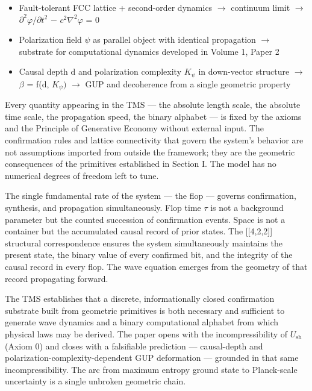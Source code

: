 \documentclass[11pt,oneside]{report}
\theoremstyle{definition}
\theoremstyle{remark}
\begin{document}
\begin{itemize}
  co-generated conjugate pair \ensuremath{(\varphi ,} \ensuremath{\Pi )} \ensuremath{\to} second-order dynamics
\item
  Fault-tolerant FCC lattice + second-order dynamics \ensuremath{\to} continuum limit \ensuremath{\to}
  \ensuremath{\partial ^{2}\varphi /\partial t^{2}} \ensuremath{-} \ensuremath{c^{2}\nabla ^{2}\varphi} = 0
\item
  Polarization field \ensuremath{\psi} as parallel object with identical propagation \ensuremath{\to}
  substrate for computational dynamics developed in Volume 1, Paper 2
\item
  Causal depth d and polarization complexity \ensuremath{K_{\psi}} in down-vector
  structure \ensuremath{\to} \ensuremath{\beta} = f(d, \ensuremath{K_{\psi})} \ensuremath{\to} GUP and decoherence from a single
  geometric property
\end{itemize}

Every quantity appearing in the TMS --- the absolute length scale, the
absolute time scale, the propagation speed, the binary alphabet --- is
fixed by the axioms and the Principle of Generative Economy without
external input. The confirmation rules and lattice connectivity that
govern the system's behavior are not assumptions imported from outside
the framework; they are the geometric consequences of the primitives
established in Section I. The model has no numerical degrees of freedom
left to tune.

The single fundamental rate of the system --- the flop --- governs
confirmation, synthesis, and propagation simultaneously. Flop time \ensuremath{\tau} is
not a background parameter but the counted succession of confirmation
events. Space is not a container but the accumulated causal record of
prior states. The [[4,2,2]] structural correspondence ensures
the system simultaneously maintains the present state, the binary value
of every confirmed bit, and the integrity of the causal record in every
flop. The wave equation emerges from the geometry of that record
propagating forward.

The TMS establishes that a discrete, informationally closed confirmation
substrate built from geometric primitives is both necessary and
sufficient to generate wave dynamics and a binary computational alphabet
from which physical laws may be derived. The paper opens with the
incompressibility of \ensuremath{U_{\mathrm{sh}}} (Axiom 0) and closes with a falsifiable
prediction --- causal-depth and polarization-complexity-dependent GUP
deformation --- grounded in that same incompressibility. The arc from
maximum entropy ground state to Planck-scale uncertainty is a single
unbroken geometric chain.
\end{document}
